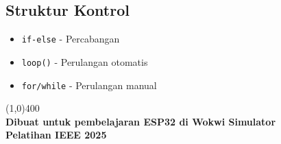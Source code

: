 \documentclass[12pt,a4paper]{article}
\begin{document}
\subsection{Struktur Kontrol}
\begin{itemize}
    \item \texttt{if-else} - Percabangan
    \item \texttt{loop()} - Perulangan otomatis
    \item \texttt{for/while} - Perulangan manual
\end{itemize}

\vspace{1cm}
\begin{center}
\line(1,0){400}\\
\textbf{Dibuat untuk pembelajaran ESP32 di Wokwi Simulator}\\
\textbf{Pelatihan IEEE 2025}
\end{center}
\end{document}
